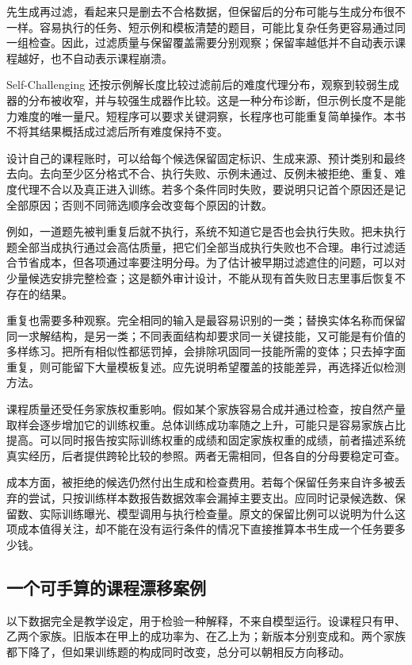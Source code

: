 先生成再过滤，看起来只是删去不合格数据，但保留后的分布可能与生成分布很不一样。容易执行的任务、短示例和模板清楚的题目，可能比复杂任务更容易通过同一组检查。因此，过滤质量与保留覆盖需要分别观察；保留率越低并不自动表示课程越好，也不自动表示课程崩溃。

Self-Challenging 还按示例解长度比较过滤前后的难度代理分布，观察到较弱生成器的分布被收窄，并与较强生成器作比较\cite{self-challenging-2506}。这是一种分布诊断，但示例长度不是能力难度的唯一量尺。短程序可以要求关键洞察，长程序也可能重复简单操作。本书不将其结果概括成过滤后所有难度保持不变。

设计自己的课程账时，可以给每个候选保留固定标识、生成来源、预计类别和最终去向。去向至少区分格式不合、执行失败、示例未通过、反例未被拒绝、重复、难度代理不合以及真正进入训练。若多个条件同时失败，要说明只记首个原因还是记全部原因；否则不同筛选顺序会改变每个原因的计数。

例如，一道题先被判重复后就不执行，系统不知道它是否也会执行失败。把未执行题全部当成执行通过会高估质量，把它们全部当成执行失败也不合理。串行过滤适合节省成本，但各项通过率要注明分母。为了估计被早期过滤遮住的问题，可以对少量候选安排完整检查；这是额外审计设计，不能从现有首失败日志里事后恢复不存在的结果。

重复也需要多种观察。完全相同的输入是最容易识别的一类；替换实体名称而保留同一求解结构，是另一类；不同表面结构却要求同一关键技能，又可能是有价值的多样练习。把所有相似性都惩罚掉，会排除巩固同一技能所需的变体；只去掉字面重复，则可能留下大量模板复述。应先说明希望覆盖的技能差异，再选择近似检测方法。

课程质量还受任务家族权重影响。假如某个家族容易合成并通过检查，按自然产量取样会逐步增加它的训练权重。总体训练成功率随之上升，可能只是容易家族占比提高。可以同时报告按实际训练权重的成绩和固定家族权重的成绩，前者描述系统真实经历，后者提供跨轮比较的参照。两者无需相同，但各自的分母要稳定可查。

成本方面，被拒绝的候选仍然付出生成和检查费用。若每个保留任务来自许多被丢弃的尝试，只按训练样本数报告数据效率会漏掉主要支出。应同时记录候选数、保留数、实际训练曝光、模型调用与执行检查量。原文的保留比例可以说明为什么这项成本值得关注，却不能在没有运行条件的情况下直接推算本书生成一个任务要多少钱。

\subsection{一个可手算的课程漂移案例}
\label{sec:ch11-driftexample}

以下数据完全是教学设定，用于检验一种解释，不来自模型运行。设课程只有甲、乙两个家族。旧版本在甲上的成功率为、在乙上为；新版本分别变成和。两个家族都下降了，但如果训练题的构成同时改变，总分可以朝相反方向移动。


